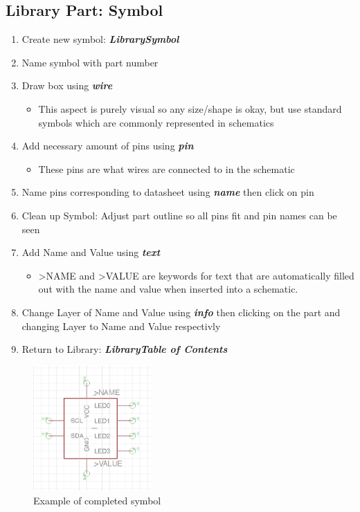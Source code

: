 \documentclass{article}
\begin{document}
\subsection{Library Part: Symbol}
\begin{enumerate}
    \item Create new symbol: \textit{\textbf{Library\textrightarrow Symbol}}
    \item Name symbol with part number
    \item Draw box using \textit{\textbf{wire}}
    \begin{itemize}
        \item This aspect is purely visual so any size/shape is okay, but use standard symbols which are commonly represented in schematics
    \end{itemize}
    \item Add necessary amount of pins using \textit{\textbf{pin}}
    \begin{itemize}
        \item These pins are what wires are connected to in the schematic
    \end{itemize}
    \item Name pins corresponding to datasheet using \textit{\textbf{name}} then click on pin
    \item Clean up Symbol: Adjust part outline so all pins fit and pin names can be seen
    \item Add Name and Value using \textit{\textbf{text}}
    \begin{itemize}
        \item \textgreater NAME and  \textgreater VALUE are keywords for text that are automatically filled out with the name and value when inserted into a schematic.
    \end{itemize}
    \item Change Layer of Name and Value using \textit{\textbf{info}} then clicking on the part and changing Layer to Name and Value respectivly
    \item Return to Library: \textit{\textbf{Library\textrightarrow Table of Contents}}
\end{enumerate}

\begin{figure}[!h]
    \center
    \includegraphics[width=0.4\textwidth,height=0.4\textheight,keepaspectratio]{symbol}
    \caption {Example of completed symbol}
    \label{img:symbol}
\end{figure}
\end{document}
